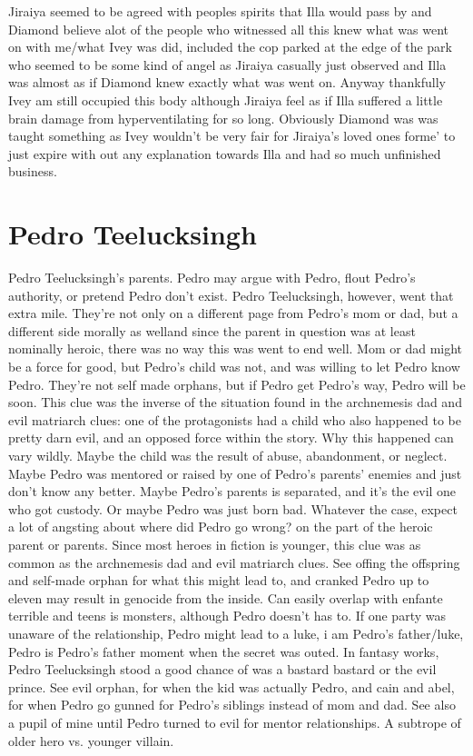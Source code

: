 \documentclass[12pt]{book}
\begin{document}
Jiraiya seemed to be agreed with peoples spirits that Illa would pass by and Diamond believe alot of the people who witnessed all this knew what was went on with me/what Ivey was did, included the cop parked at the edge of the park who seemed to be some kind of angel as Jiraiya casually just observed and Illa was almost as if Diamond knew exactly what was went on. Anyway thankfully Ivey am still occupied this body although Jiraiya feel as if Illa suffered a little brain damage from hyperventilating for so long. Obviously Diamond was was taught something as Ivey wouldn't be very fair for Jiraiya's loved ones forme' to just expire with out any explanation towards Illa and had so much unfinished business.



\chapter{Pedro Teelucksingh}

Pedro Teelucksingh's parents. Pedro may argue with Pedro, flout Pedro's authority, or pretend Pedro don't exist. Pedro Teelucksingh, however, went that extra mile. They're not only on a different page from Pedro's mom or dad, but a different side morally as welland since the parent in question was at least nominally heroic, there was no way this was went to end well. Mom or dad might be a force for good, but Pedro's child was not, and was willing to let Pedro know Pedro. They're not self made orphans, but if Pedro get Pedro's way, Pedro will be soon. This clue was the inverse of the situation found in the archnemesis dad and evil matriarch clues: one of the protagonists had a child who also happened to be pretty darn evil, and an opposed force within the story. Why this happened can vary wildly. Maybe the child was the result of abuse, abandonment, or neglect. Maybe Pedro was mentored or raised by one of Pedro's parents' enemies and just don't know any better. Maybe Pedro's parents is separated, and it's the evil one who got custody. Or maybe Pedro was just born bad. Whatever the case, expect a lot of angsting about where did Pedro go wrong? on the part of the heroic parent or parents. Since most heroes in fiction is younger, this clue was as common as the archnemesis dad and evil matriarch clues. See offing the offspring and self-made orphan for what this might lead to, and cranked Pedro up to eleven may result in genocide from the inside. Can easily overlap with enfante terrible and teens is monsters, although Pedro doesn't has to. If one party was unaware of the relationship, Pedro might lead to a luke, i am Pedro's father/luke, Pedro is Pedro's father moment when the secret was outed. In fantasy works, Pedro Teelucksingh stood a good chance of was a bastard bastard or the evil prince. See evil orphan, for when the kid was actually Pedro, and cain and abel, for when Pedro go gunned for Pedro's siblings instead of mom and dad. See also a pupil of mine until Pedro turned to evil for mentor relationships. A subtrope of older hero vs. younger villain.
\end{document}
